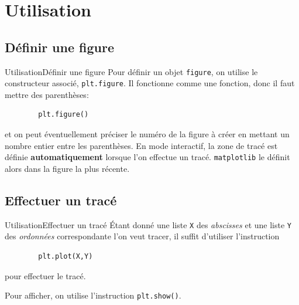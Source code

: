 \section{Utilisation}

\subsection{Définir une figure}

\begin{frame}[fragile]{Utilisation}{Définir une figure}
	Pour définir un objet \lstinline|figure|, on utilise le constructeur associé, \lstinline|plt.figure|. Il fonctionne comme une fonction, donc il faut mettre des parenthèses:\pause
	\begin{lstlisting}
		plt.figure()
	\end{lstlisting}
	\pause
	et on peut éventuellement préciser le numéro de la figure à créer en mettant un nombre entier entre les parenthèses.
	\pause
	En mode interactif, la zone de tracé est définie \textbf{automatiquement} lorsque l'on effectue un tracé. \lstinline|matplotlib| le définit alors dans la figure la plus récente.
\end{frame}

\subsection{Effectuer un tracé}

\begin{frame}[fragile]{Utilisation}{Effectuer un tracé}
	Étant donné une liste \lstinline|X| des \textit{abscisses} et une liste \lstinline|Y| des \textit{ordonnées} correspondante l'on veut tracer, il suffit d'utiliser l'instruction
	\begin{lstlisting}
		plt.plot(X,Y)
	\end{lstlisting} 
	pour effectuer le tracé.
	
	Pour afficher, on utilise l'instruction \lstinline|plt.show()|.
\end{frame}


